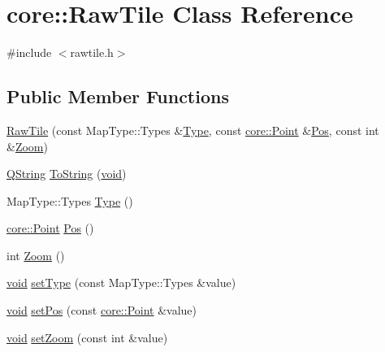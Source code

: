 \hypertarget{classcore_1_1_raw_tile}{\section{core\-:\-:\-Raw\-Tile \-Class \-Reference}
\label{classcore_1_1_raw_tile}
}


{\ttfamily \#include $<$rawtile.\-h$>$}

\subsection*{\-Public \-Member \-Functions}
\begin{DoxyCompactItemize}
\item 
\hyperlink{group___o_p_map_widget_ga6ea25b848193120014a2b04afbdf8913}{\-Raw\-Tile} (const \-Map\-Type\-::\-Types \&\hyperlink{group___o_p_map_widget_gab7a1ec0019fc105d9691bb2f0465f6b1}{\-Type}, const \hyperlink{structcore_1_1_point}{core\-::\-Point} \&\hyperlink{group___o_p_map_widget_ga1c62f80ba95a32840e72ccfa745f503f}{\-Pos}, const int \&\hyperlink{group___o_p_map_widget_gabd1ed75e92f807c70de10034d9d5dda4}{\-Zoom})
\item 
\hyperlink{group___u_a_v_objects_plugin_gab9d252f49c333c94a72f97ce3105a32d}{\-Q\-String} \hyperlink{group___o_p_map_widget_gaf820aab5311f0f43e2e64399dcb65ef7}{\-To\-String} (\hyperlink{group___u_a_v_objects_plugin_ga444cf2ff3f0ecbe028adce838d373f5c}{void})
\item 
\-Map\-Type\-::\-Types \hyperlink{group___o_p_map_widget_gab7a1ec0019fc105d9691bb2f0465f6b1}{\-Type} ()
\item 
\hyperlink{structcore_1_1_point}{core\-::\-Point} \hyperlink{group___o_p_map_widget_ga1c62f80ba95a32840e72ccfa745f503f}{\-Pos} ()
\item 
int \hyperlink{group___o_p_map_widget_gabd1ed75e92f807c70de10034d9d5dda4}{\-Zoom} ()
\item 
\hyperlink{group___u_a_v_objects_plugin_ga444cf2ff3f0ecbe028adce838d373f5c}{void} \hyperlink{group___o_p_map_widget_gaa1c1e525ae0bd6aa39e0d3535cb696c8}{set\-Type} (const \-Map\-Type\-::\-Types \&value)
\item 
\hyperlink{group___u_a_v_objects_plugin_ga444cf2ff3f0ecbe028adce838d373f5c}{void} \hyperlink{group___o_p_map_widget_ga1c6d9581bee67f1fd163df34471594da}{set\-Pos} (const \hyperlink{structcore_1_1_point}{core\-::\-Point} \&value)
\item 
\hyperlink{group___u_a_v_objects_plugin_ga444cf2ff3f0ecbe028adce838d373f5c}{void} \hyperlink{group___o_p_map_widget_ga74673bcbb15e8d7c09ef6e909d40a813}{set\-Zoom} (const int \&value)
\end{DoxyCompactItemize}

